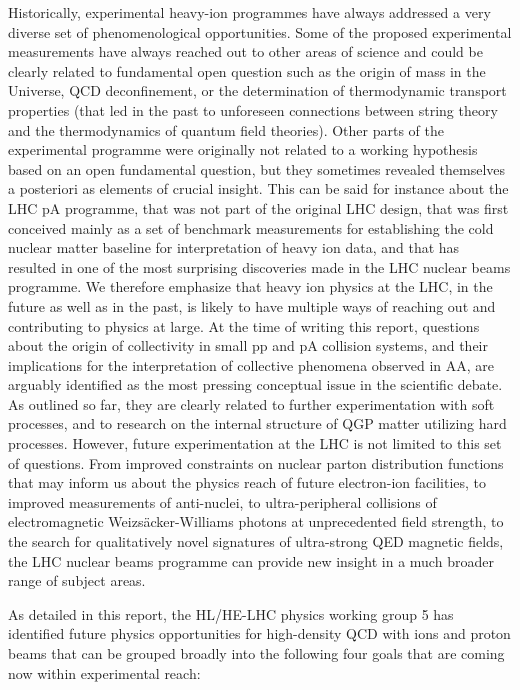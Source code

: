 \documentclass[../report.tex]{subfiles}
\begin{document}
Historically, experimental heavy-ion programmes have always addressed a very diverse set of phenomenological opportunities. Some of the proposed experimental measurements have always reached out to other areas of science and could be clearly related to fundamental open question such as the origin of mass in the Universe, QCD deconfinement, or the determination of thermodynamic transport properties (that led in the past to unforeseen connections between string theory and the thermodynamics of quantum field theories). Other parts of the experimental programme were originally not related to a working hypothesis based on an open fundamental question, but they sometimes revealed themselves a posteriori as elements of crucial insight. This can be said for instance about the LHC pA programme, that was not part of the original LHC design, that was first conceived mainly as a set of benchmark measurements for establishing the cold nuclear matter baseline for interpretation of heavy ion data, and that has resulted in one of the most surprising discoveries made in the LHC nuclear beams programme. We therefore emphasize that heavy ion physics at the LHC, in the future as well as in the past, is likely to have multiple ways of reaching out and contributing to physics at large. At the time of writing this report, questions about the origin of collectivity in small pp and pA collision systems, and their implications for the interpretation of collective phenomena observed in AA, are arguably identified as the most pressing conceptual issue in the scientific debate. As outlined so far, they are clearly related to further experimentation with soft processes, and to research on the internal structure of QGP matter utilizing hard processes.  However, future experimentation at the LHC is not limited to this set of questions. From improved constraints on nuclear parton distribution functions that may inform us about the physics reach of future electron-ion facilities, to improved measurements of anti-nuclei, to ultra-peripheral collisions of electromagnetic Weizs\"acker-Williams photons at unprecedented field strength, to the search for qualitatively novel signatures of ultra-strong QED magnetic fields, the LHC nuclear beams programme can provide new insight in a much broader range of subject areas. 

As detailed in this report, the HL/HE-LHC physics working group 5 has identified future physics opportunities for high-density QCD with ions and proton beams that can be grouped broadly into the following four goals that are coming now within experimental reach:
\end{document}
